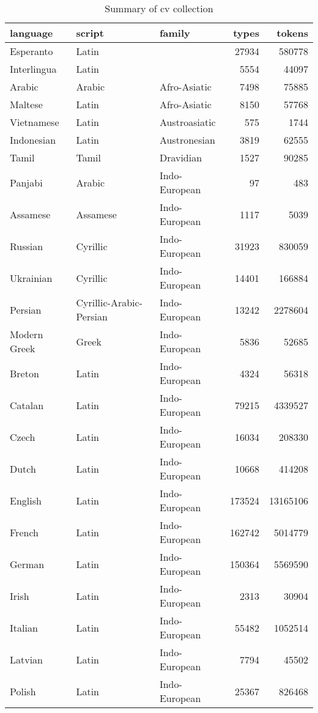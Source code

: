 \begin{table}[H]
\centering
\caption{Summary of cv collection} 
\label{tab:coll_summary_cv}
\begin{tabular}{lllrr}
  \hline
language & script & family & types & tokens \\ 
  \hline
Esperanto & Latin &  & 27934 & 580778 \\ 
  Interlingua & Latin &  & 5554 & 44097 \\ 
  Arabic & Arabic & Afro-Asiatic & 7498 & 75885 \\ 
  Maltese & Latin & Afro-Asiatic & 8150 & 57768 \\ 
  Vietnamese & Latin & Austroasiatic & 575 & 1744 \\ 
  Indonesian & Latin & Austronesian & 3819 & 62555 \\ 
  Tamil & Tamil & Dravidian & 1527 & 90285 \\ 
  Panjabi & Arabic & Indo-European &  97 & 483 \\ 
  Assamese & Assamese & Indo-European & 1117 & 5039 \\ 
  Russian & Cyrillic & Indo-European & 31923 & 830059 \\ 
  Ukrainian & Cyrillic & Indo-European & 14401 & 166884 \\ 
  Persian & Cyrillic-Arabic-Persian & Indo-European & 13242 & 2278604 \\ 
  Modern Greek & Greek & Indo-European & 5836 & 52685 \\ 
  Breton & Latin & Indo-European & 4324 & 56318 \\ 
  Catalan & Latin & Indo-European & 79215 & 4339527 \\ 
  Czech & Latin & Indo-European & 16034 & 208330 \\ 
  Dutch & Latin & Indo-European & 10668 & 414208 \\ 
  English & Latin & Indo-European & 173524 & 13165106 \\ 
  French & Latin & Indo-European & 162742 & 5014779 \\ 
  German & Latin & Indo-European & 150364 & 5569590 \\ 
  Irish & Latin & Indo-European & 2313 & 30904 \\ 
  Italian & Latin & Indo-European & 55482 & 1052514 \\ 
  Latvian & Latin & Indo-European & 7794 & 45502 \\ 
  Polish & Latin & Indo-European & 25367 & 826468 \\ 

\end{tabular}
\end{table}
